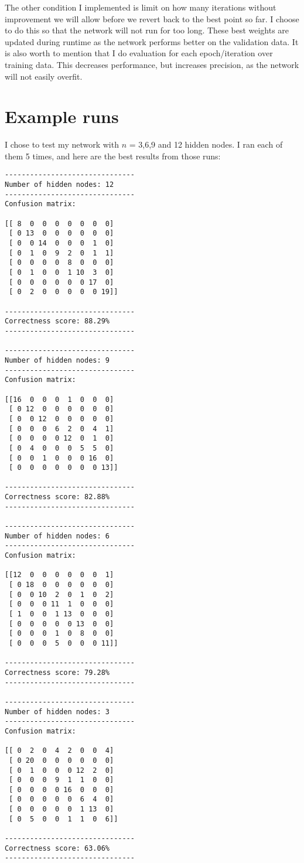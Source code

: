 \documentclass[a4paper, norsk, 12pt]{article}
\begin{document}
\noindent The other condition I implemented is limit on how many iterations without improvement we will allow before we revert back to the best point so far. I choose to do this so that the network will not run for too long. These best weights are updated during runtime as the network performs better on the validation data. It is also worth to mention that I do evaluation for each epoch/iteration over training data. This decreases performance, but increases precision, as the network will not easily overfit. 


\section{Example runs}
I chose to test my network with $n$ = 3,6,9 and 12 hidden nodes. I ran each of them 5 times, and here are the best results from those runs: 

\begin{lstlisting}
-------------------------------
Number of hidden nodes: 12
-------------------------------
Confusion matrix:

[[ 8  0  0  0  0  0  0  0]
 [ 0 13  0  0  0  0  0  0]
 [ 0  0 14  0  0  0  1  0]
 [ 0  1  0  9  2  0  1  1]
 [ 0  0  0  0  8  0  0  0]
 [ 0  1  0  0  1 10  3  0]
 [ 0  0  0  0  0  0 17  0]
 [ 0  2  0  0  0  0  0 19]]

-------------------------------
Correctness score: 88.29%
-------------------------------

-------------------------------
Number of hidden nodes: 9
-------------------------------
Confusion matrix:

[[16  0  0  0  1  0  0  0]
 [ 0 12  0  0  0  0  0  0]
 [ 0  0 12  0  0  0  0  0]
 [ 0  0  0  6  2  0  4  1]
 [ 0  0  0  0 12  0  1  0]
 [ 0  4  0  0  0  5  5  0]
 [ 0  0  1  0  0  0 16  0]
 [ 0  0  0  0  0  0  0 13]]

-------------------------------
Correctness score: 82.88%
-------------------------------

-------------------------------
Number of hidden nodes: 6
-------------------------------
Confusion matrix:

[[12  0  0  0  0  0  0  1]
 [ 0 18  0  0  0  0  0  0]
 [ 0  0 10  2  0  1  0  2]
 [ 0  0  0 11  1  0  0  0]
 [ 1  0  0  1 13  0  0  0]
 [ 0  0  0  0  0 13  0  0]
 [ 0  0  0  1  0  8  0  0]
 [ 0  0  0  5  0  0  0 11]]

-------------------------------
Correctness score: 79.28%
-------------------------------

-------------------------------
Number of hidden nodes: 3
-------------------------------
Confusion matrix:

[[ 0  2  0  4  2  0  0  4]
 [ 0 20  0  0  0  0  0  0]
 [ 0  1  0  0  0 12  2  0]
 [ 0  0  0  9  1  1  0  0]
 [ 0  0  0  0 16  0  0  0]
 [ 0  0  0  0  0  6  4  0]
 [ 0  0  0  0  0  1 13  0]
 [ 0  5  0  0  1  1  0  6]]

-------------------------------
Correctness score: 63.06%
-------------------------------
\end{lstlisting}
\end{document}
